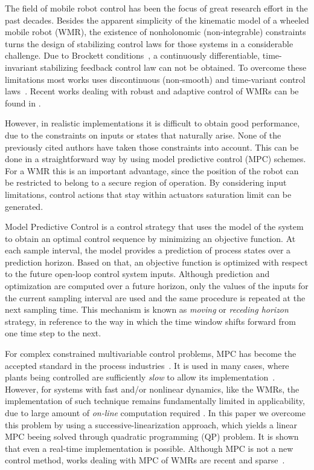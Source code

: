 \documentclass[conference]{IEEEtran} %
\begin{document}
The field of mobile robot control has been the focus of great research effort in the past decades. Besides the apparent simplicity of the kinematic model of a wheeled mobile robot (WMR), the existence of nonholonomic (non-integrable) constraints turns the design of stabilizing control laws for those systems in a considerable challenge. Due to Brockett
conditions~\cite{brockett82}, a continuously differentiable, time-invariant stabilizing feedback control law can not be obtained. To overcome these limitations most works uses discontinuous (non-smooth) and time-variant control laws~\cite{bloch89,samson91,canudas92,yamamoto94,murray97}. Recent works dealing with robust and adaptive control of WMRs can be found in \cite{oya03,dixon04}.

However, in realistic implementations it is difficult to obtain good performance, due to the constraints on inputs or states that naturally arise. None of the previously cited authors have taken those constraints into account. This can be done in a straightforward way by using model predictive control (MPC) schemes. For a WMR this is an important advantage,
since the position of the robot can be restricted to belong to a secure region of operation. By considering input limitations, control actions that stay within actuators saturation limit can be generated.

Model Predictive Control is a control strategy that uses the model of the system to obtain an optimal control sequence by minimizing an objective function. At each sample interval, the model provides a prediction of process states over a prediction horizon. Based on that, an objective function is optimized with respect to the future open-loop control system
inputs. Although prediction and optimization are computed over a future horizon, only the values of the inputs for the current sampling interval are used and the same procedure is repeated at the next sampling time. This mechanism is known as {\it moving} or {\it receding horizon} strategy, in reference to the way in which the time window shifts forward from one time step to the next.

For complex constrained multivariable control problems, MPC has become the accepted standard in the process industries~\cite{bemporad02}. It is used in many cases, where plants being controlled are sufficiently {\em slow} to allow its implementation~\cite{mayne98}. However, for systems with fast and/or nonlinear dynamics, like the WMRs, the implementation of such technique remains fundamentally limited in applicability, due to large amount of {\em on-line} computation required \cite{cannon00}. In this paper we overcome this problem by using a successive-linearization approach, which yields a linear MPC beeing solved through quadratic programming (QP) problem. It is shown that even a real-time implementation is possible. Although MPC is not a new control method, works dealing with MPC of WMRs are recent and sparse~\cite{ollero91,rico99,essen01}.
\end{document}
